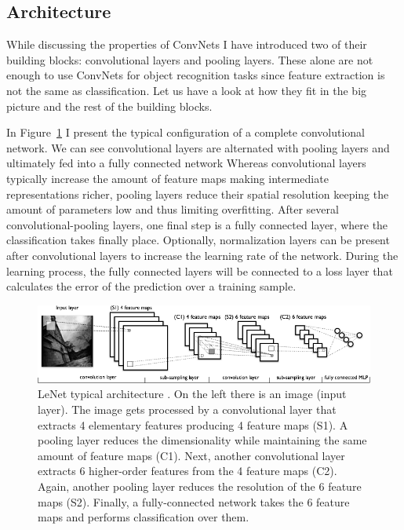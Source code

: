 \subsection{Architecture}
\label{sub:theory:convnets:achitecture}

While discussing the properties of ConvNets I have introduced two of their building blocks: convolutional layers and pooling layers.
These alone are not enough to use ConvNets for object recognition tasks since feature extraction is not the same as classification.
Let us have a look at how they fit in the big picture and the rest of the building blocks.

In Figure~\ref{fig:sec:theory:convnet} I present the typical configuration of a complete convolutional network.
We can see convolutional layers are alternated with pooling layers and ultimately fed into a fully connected network
Whereas convolutional layers typically increase the amount of feature maps making intermediate representations richer, pooling layers reduce their spatial resolution keeping the amount of parameters low and thus limiting overfitting.
After several convolutional-pooling layers, one final step is a fully connected layer, where the classification takes finally place.
Optionally, normalization layers can be present after convolutional layers to increase the learning rate of the network.
During the learning process, the fully connected layers will be connected to a loss layer that calculates the error of the prediction over a training sample.

\begin{figure}[htb]
  \begin{center}
    \includegraphics[width=\textwidth]{gfx/conv-network}
  \end{center}
  \caption{LeNet typical architecture \cite{LaboratoiredInformatiquedesSystemesAdaptatifs2010}.
    On the left there is an image (input layer).
    The image gets processed by a convolutional layer that extracts 4 elementary features producing 4 feature maps (S1).
    A pooling layer reduces the dimensionality while maintaining the same amount of feature maps (C1).
    Next, another convolutional layer extracts 6 higher-order features from the 4 feature maps (C2).
    Again, another pooling layer reduces the resolution of the 6 feature maps (S2).
    Finally, a fully-connected network takes the 6 feature maps and performs classification over them.}
  \label{fig:sec:theory:convnet}
\end{figure}


